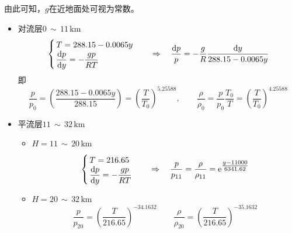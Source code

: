 \noindent 由此可知，$g$在近地面处可视为常数。

\begin{itemize}
	\item 对流层$ 0\, \sim \,  11 \,\text{km} $
	\begin{equation*}
		\begin{cases}
			\, T = 288.15 - 0.0065y\\
			\, \dfrac{{\rm{d}} p}{{\rm{d}} y} = - \dfrac{gp}{RT}
		\end{cases}
		\quad \Rightarrow \quad \dfrac{{\rm{d}} p}{p} = -\dfrac{g}{R}\dfrac{{\rm{d}} y}{288.15 - 0.0065y}
	\end{equation*}
	即
	\begin{equation}
		\dfrac{p}{p_0} = \left(\dfrac{288.15 - 0.0065y}{288.15}\right) = \left(\dfrac{T}{T_0}\right)^{5.25588},\qquad \dfrac{\rho}{\rho_0} = \dfrac{p}{p_0}\dfrac{T_0}{T} = \left(\dfrac{T}{T_0}\right)^{4.25588}
	\end{equation}
	\item 平流层$ 11\, \sim \,  32 \,\text{km} $
	\begin{itemize}
		\item $H = 11 \, \sim \, 20 \, \text{km}$
		\begin{equation}
			\begin{cases}
				\, T = 216.65\\
				\, \dfrac{{\rm{d}} p}{{\rm{d}} y} = - \dfrac{gp}{RT}
			\end{cases}
		\quad \Rightarrow \quad 
		\dfrac{p}{p_{11}} = \dfrac{\rho}{\rho_{11}}={\rm{e}}^{\textstyle \frac{y-11000}{6341.62}}
		\end{equation}
		\item $H = 20 \, \sim \, 32 \, \text{km}$
		\begin{equation}
			\dfrac{p}{p_{20}} = \left(\dfrac{T}{216.65}\right)^{-34.1632} \qquad \dfrac{\rho}{\rho_{20}} = \left(\dfrac{T}{216.65}\right)^{-35.1632}
		\end{equation}
	\end{itemize}
\end{itemize}



